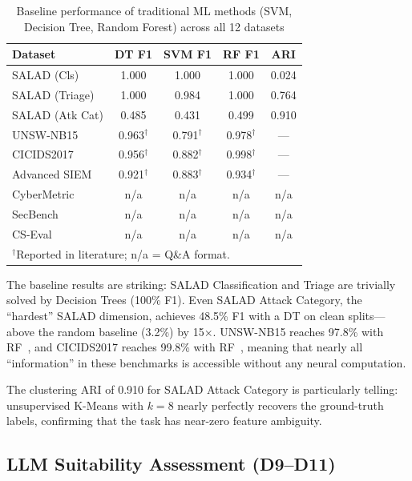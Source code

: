 \documentclass[journal]{IEEEtran}
\begin{document}
\begin{table}[!ht]
\centering
\caption{Baseline performance of traditional ML methods (SVM, Decision Tree, Random Forest) across all 12 datasets}
\label{tab:baselines}
\begin{tabular}{lcccc}
\toprule
\textbf{Dataset} & \textbf{DT F1} & \textbf{SVM F1} & \textbf{RF F1} & \textbf{ARI} \\
\midrule
SALAD (Cls) & 1.000 & 1.000 & 1.000 & 0.024 \\
SALAD (Triage) & 1.000 & 0.984 & 1.000 & 0.764 \\
SALAD (Atk Cat) & 0.485 & 0.431 & 0.499 & 0.910 \\
UNSW-NB15 & 0.963$^\dagger$ & 0.791$^\dagger$ & 0.978$^\dagger$ & --- \\
CICIDS2017 & 0.956$^\dagger$ & 0.882$^\dagger$ & 0.998$^\dagger$ & --- \\
Advanced SIEM & 0.921$^\dagger$ & 0.883$^\dagger$ & 0.934$^\dagger$ & --- \\
CyberMetric & n/a & n/a & n/a & n/a \\
SecBench & n/a & n/a & n/a & n/a \\
CS-Eval & n/a & n/a & n/a & n/a \\
\bottomrule
\multicolumn{5}{l}{\scriptsize $^\dagger$Reported in literature; n/a = Q\&A format.}
\end{tabular}
\end{table}

The baseline results are striking: SALAD Classification and Triage are trivially solved by Decision Trees (100\% F1). Even SALAD Attack Category, the ``hardest'' SALAD dimension, achieves 48.5\% F1 with a DT on clean splits---above the random baseline (3.2\%) by 15$\times$. UNSW-NB15 reaches 97.8\% with RF~\cite{moustafa2016}, and CICIDS2017 reaches 99.8\% with RF~\cite{sharafaldin2018}, meaning that nearly all ``information'' in these benchmarks is accessible without any neural computation.

The clustering ARI of 0.910 for SALAD Attack Category is particularly telling: unsupervised K-Means with $k=8$ nearly perfectly recovers the ground-truth labels, confirming that the task has near-zero feature ambiguity.

\subsection{LLM Suitability Assessment (D9--D11)}
\end{document}
